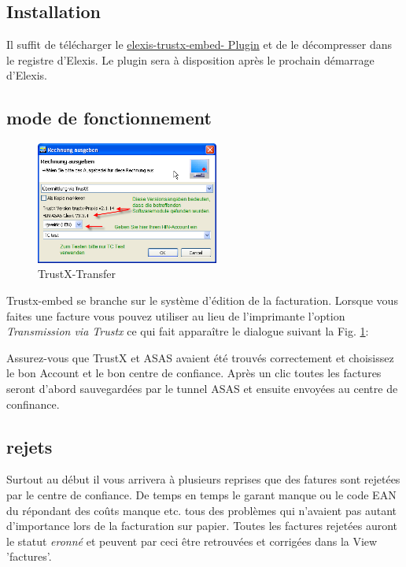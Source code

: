\subsection{Installation}
Il suffit de télécharger le \href{http://www.elexis.ch/files/elexis-trustx-embed.zip}{elexis-trustx-embed- Plugin} et de le décompresser dans le registre d'Elexis. Le plugin sera à disposition après le prochain démarrage d'Elexis.

\subsection{mode de fonctionnement}
\begin{figure}
\includegraphics[width=6cm]{images/trustx.png}
\caption{TrustX-Transfer}
\label{fig:trustx}
\end{figure}

Trustx-embed se branche sur le système d'édition de la facturation. Lorsque vous faites une facture vous pouvez utiliser au lieu de l'imprimante l'option \textit{Transmission via Trustx} ce qui fait apparaître le dialogue suivant la Fig. \ref{fig:trustx}:

Assurez-vous que TrustX et ASAS avaient été trouvés correctement et choisissez le bon Account et le bon centre de confiance. Après un clic toutes les factures seront d'abord sauvegardées par le tunnel ASAS et ensuite envoyées au centre de confinance.

\subsection{rejets}
Surtout au début il vous arrivera à plusieurs reprises que des fatures sont rejetées par le centre de confiance. De temps en temps le garant manque ou le code EAN du répondant des coûts manque etc. tous des problèmes qui n'avaient pas autant d'importance lors de la facturation sur papier. Toutes les factures rejetées auront le statut \textit{eronné} et peuvent par ceci être retrouvées et corrigées dans la View 'factures'.

